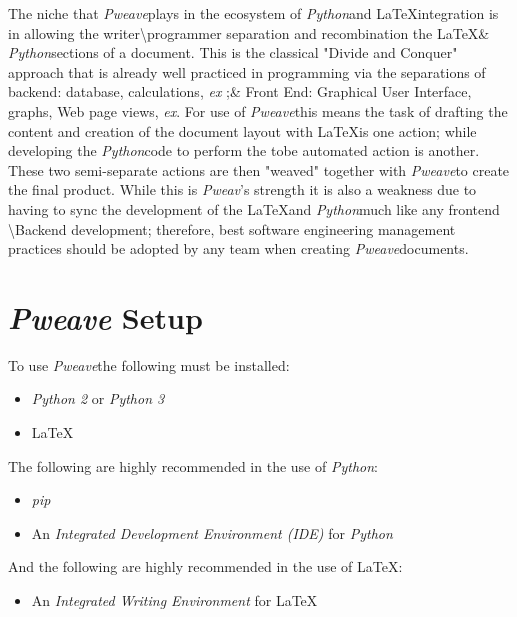 \documentclass[a4paper,11pt,final]{article}
\newcommand{\pweave}{\emph{Pweave}\space}
\newcommand{\python}{\emph{Python}\space}
\newcommand{\latex}{\LaTeX\space}
\begin{document}
  The niche that \pweave plays in the ecosystem of \python and \latex integration is in allowing the writer\textbackslash programmer separation and recombination the \latex \& \python sections of a document. This is the classical "Divide and Conquer" approach that is already well practiced in programming via the separations of backend: database, calculations, \textit{ex} ;\& Front End: Graphical User Interface, graphs, Web page views, \textit{ex}. For use of \pweave this means the task of drafting the content and creation of the document layout with \latex is one action; while developing the \python code to perform the tobe automated action is another. These two semi-separate actions are then "weaved" together with \pweave to create the final product. While this is \emph{Pweav}'s strength it is also a weakness due to having to sync the development of the \latex and \python much like any frontend \textbackslash Backend development; therefore, best software engineering management practices should be adopted by any team when creating \pweave documents.

\section{\emph{Pweave} Setup}
  To use \pweave the following must be installed:
     \begin{itemize}
        \item \emph{Python 2} or \emph{Python 3}
        \item \latex
     \end{itemize}

  \noindent The following are highly recommended in the use of \python:
     \begin{itemize}
        \item \emph{pip}
        \item An \emph{Integrated Development Environment (IDE)} for \python
     \end{itemize}


  And the following are highly recommended in the use of \latex:
     \begin{itemize}
        \item An \emph{Integrated Writing Environment} for \latex
     \end{itemize}
\end{document}
